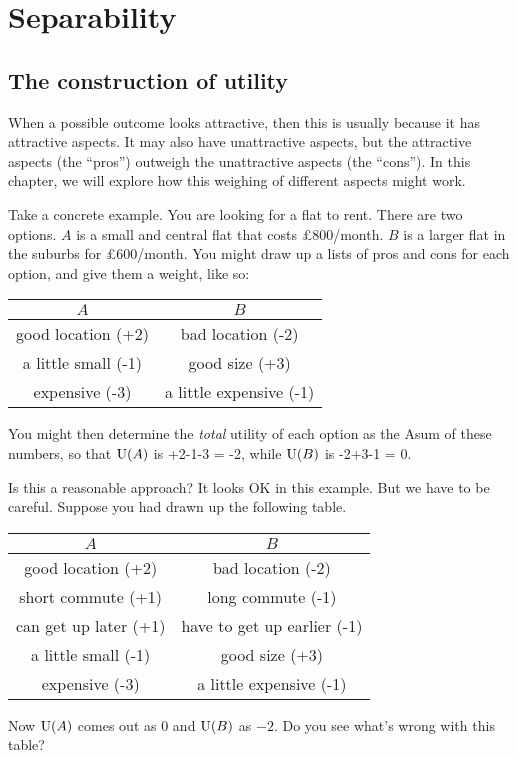 \chapter{Separability}\label{ch:separability}

\section{The construction of utility}\label{sec:construction-value}

When a possible outcome looks attractive, then this is usually because it has
attractive aspects. It may also have unattractive aspects, but the attractive
aspects (the ``pros'') outweigh the unattractive aspects (the ``cons''). In this
chapter, we will explore how this weighing of different aspects might work.

Take a concrete example. You are looking for a flat to rent. There are two
options. $A$ is a small and central flat that costs £800/month. $B$ is a larger
flat in the suburbs for £600/month. You might draw up a lists of pros and cons
for each option, and give them a weight, like so:

\medskip
\begin{center}
  \def\arraystretch{1} %
  \begin{tabular}{|c|c|}
    \rowcolor{gray!20}
    $A$                & $B$ \\\hline
    good location (+2) & bad location (-2) \\
    a little small (-1) & good size (+3) \\
    expensive (-3) & a little expensive (-1) \\\hline 
  \end{tabular}
\end{center}
\medskip\noindent%
You might then determine the \emph{total} utility of each option as the Asum of
these numbers, so that $\text{U}(A)$ is +2-1-3 = -2, while $\text{U}(B)$ is -2+3-1 = 0.

Is this a reasonable approach? It looks OK in this example. But we have to be
careful. Suppose you had drawn up the following table.
\medskip
\begin{center}
  \def\arraystretch{1} %
  \begin{tabular}{|c|c|}
    \rowcolor{gray!20}
    $A$                & $B$ \\\hline
    good location (+2) & bad location (-2) \\
    short commute (+1) & long commute (-1) \\
    can get up later (+1) & have to get up earlier (-1) \\
    a little small (-1) & good size (+3) \\
    expensive (-3) & a little expensive (-1) \\\hline 
  \end{tabular}
\end{center}
\medskip\noindent%
Now $\text{U}(A)$ comes out as $0$ and $\text{U}(B)$ as $-2$. Do you see what's wrong with
this table?

